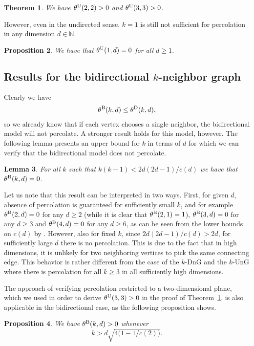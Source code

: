 \documentclass[a4paper, oneside, 11pt]{amsart}
\newcommand{\N}{\mathbb{N}}
\newtheorem{theorem}{Theorem}[section]
\newtheorem{lemma}[theorem]{Lemma}
\newtheorem{prop}[theorem]{Proposition}
\theoremstyle{definition}
\newcommand{\1}{\mathbbm{1}}
\newcommand{\0}{\mathbf{o}}
\newcommand*{\be}{\begin{equation}}
\newcommand*{\ee}{\end{equation}}
\numberwithin{equation}{section}
\begin{document}
\begin{theorem}\label{theorem-U22}
  We have $\theta^{\rm U}(2,2)>0$ and $\theta^{\rm U}(3,3)>0$.  
\end{theorem}

However, even in the undirected sense, $k=1$ is still not sufficient for percolation in any dimension $d \in \N$. 
\begin{prop}\label{prop-U1}
    We have that $\theta^{\rm U}(1,d)=0$ for all $d \geq 1$.
\end{prop}

\subsection{Results for the bidirectional $k$-neighbor graph}
Clearly we have 
\begin{align*}
    \theta^{\rm B}(k,d) \leq \theta^{\rm D}(k,d), 
\end{align*}
so we already know that if each vertex chooses a single neighbor, the bidirectional model will not percolate. A stronger result holds for this model, however. The following lemma presents an upper bound for $k$ in terms of $d$ for which we can verify that the bidirectional model does not percolate.

\begin{lemma}\label{lemma-Bnoperc}
For all $k$ such that $k(k-1)<2d(2d-1)/c(d)$ we have that $\theta^{\rm B}(k,d)=0$.
\end{lemma}
Let us note that this result can be interpreted in two ways. First, for given $d$, absence of percolation is guaranteed for sufficiently small $k$, and for example $\theta^{\rm B}(2,d)=0$ for any $d\geq 2$ (while it is clear that $\theta^{\rm B}(2,1)=1$), $\theta^{\rm B}(3,d)=0$ for any $d \geq 3$ and $\theta^{\rm B}(4,d)=0$ for any $d \geq 6$, as can be seen from the lower bounds on $c(d)$ by \cite{HSS}. However, also for fixed $k$, since $2d(2d-1)/c(d)>2d$, for sufficiently large $d$ there is no percolation. This is due to the fact that in high dimensions, it is unlikely for two neighboring vertices to pick the same connecting edge. This behavior is rather different from the case of the $k$-DnG and the $k$-UnG where there is percolation for all $k \geq 3$ in all sufficiently high dimensions.

The approach of verifying percolation restricted to a two-dimensional plane, which we used in order to derive $\theta^{\rm U}(3,3)>0$ in the proof of Theorem~\ref{theorem-U22}, is also applicable in the bidirectional case, as the following proposition shows.
\begin{prop}\label{prop-Bperc}
We have $\theta^{\rm B}(k,d) > 0$ whenever 
\be 
 k>d\sqrt{4\Big(1-1/c(2)\Big)}.
\ee 
\end{prop}
\end{document}
